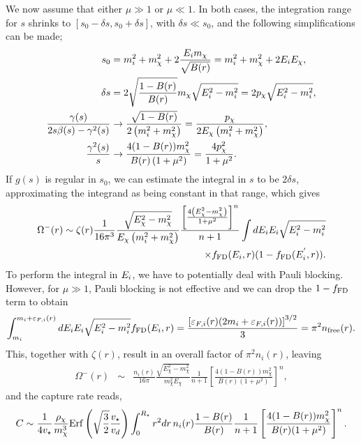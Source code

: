 We now assume that either $\mu\gg1$ or $\mu\ll1$. In both cases, the integration range for $s$ shrinks to $[s_0-\delta s, s_0+\delta s]$, with $\delta s \ll s_0$, and the following simplifications can be made;
\begin{align}
s_0 &= m_i^2+m_\chi^2 + 2\frac{E_i m_\chi}{\sqrt{B(r)}} = m_i^2+m_\chi^2 + 2E_i E_\chi,\\
\delta s &= 2\sqrt{\frac{1-B(r)}{B(r)}}m_\chi\sqrt{E_i^2-m_i^2} = 2p_\chi\sqrt{E_i^2-m_i^2}, \\ 
\frac{\gamma(s)}{2s\beta(s)-\gamma^2(s)} &\rightarrow \frac{\sqrt{1-B(r)}}{2\left(m_i^2+m_\chi^2\right)} =\frac{p_\chi}{2E_\chi\left(m_i^2+m_\chi^2\right)},\\
\frac{\gamma^2(s)}{s} &\rightarrow \frac{4(1-B(r))m_\chi^2}{B(r)\left(1+\mu^2\right)} =\frac{4p_\chi^2}{1+\mu^2}. 
\end{align}
If $g(s)$ is regular in $s_0$, we can estimate the integral in $s$ to be $  2\delta s$, approximating the integrand as being constant in that range, which gives
\begin{align}
\Omega^{-}(r) \sim \zeta(r)\frac{1}{16\pi^3} \frac{\sqrt{E_\chi^2-m_\chi^2}}{E_\chi\left(m_i^2+m_\chi^2\right)}  \frac{\left[\frac{4\left(E_\chi^2-m_\chi^2\right)}{1+\mu^2}\right]^n}{n+1}\int dE_i E_i \sqrt{E_i^2-m_i^2} \nonumber \\
\times f_{\rm FD}(E_i,r)(1-f_{\rm FD}(E_i^{'},r)). 
\end{align}
To perform the integral in $E_i$, we have to potentially deal with Pauli blocking. However, for $\mu\gg1$, Pauli blocking is not effective and we can drop the $1-f_{\rm FD}$ term to obtain
\begin{eqnarray}
 \int_{m_i}^{m_i+\varepsilon_{F,i}(r)} dE_i E_i \sqrt{E_i^2-m_i^2}  f_{\rm FD}(E_i,r) = \frac{\left[\varepsilon_{F,i}(r)(2m_i+\varepsilon_{F,i}(r))\right]^{3/2}}{3} = \pi^2 n_\mathrm{free}(r).
\end{eqnarray}
This, together with $\zeta(r)$, result in an overall factor of $\pi^2 n_i(r)$, leaving 
\begin{eqnarray}
\Omega^{-}(r) &\sim& \frac{n_i(r)}{16\pi} \frac{\sqrt{E_\chi^2-m_\chi^2}}{   m_\chi^2 E_\chi} \frac{1}{n+1} 
\left[\frac{4(1-B(r))m_\chi^2}{B(r) (1+\mu^2)}\right]^n,   
\end{eqnarray}
and the capture rate reads, 
\begin{equation}
C \sim \frac{1}{4 v_\star} \frac{\rho_\chi}{m_\chi^3}  {\rm Erf}\left(\sqrt{\frac{3}{2}}\frac{v_\star}{v_d}\right)\int_0^{R_\star}  r^2 dr \, n_i(r)  \frac{1-B(r)}{B(r)} \frac{1}{n+1} \left[\frac{4(1-B(r))m_\chi^2}{B(r) (1+\mu^2)}\right]^n.    
\end{equation}
